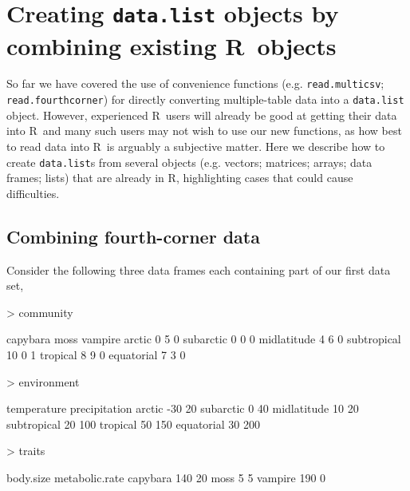 \documentclass{article}
\newcommand{\R}{{\sf R}}
\newcommand{\code}[1]{\texttt{#1}}
\numberwithin{exercise}{section}
\begin{document}
\section{Creating \code{data.list} objects by combining existing \R\ objects}

So far we have covered the use of convenience functions (e.g. \code{read.multicsv}; \code{read.fourthcorner}) for directly converting multiple-table data into a \code{data.list} object.  However, experienced \R\ users will already be good at getting their data into \R\ and many such users may not wish to use our new functions, as how best to read data into \R\ is arguably a subjective matter.  Here we describe how to create \code{data.list}s from several objects (e.g. vectors; matrices; arrays; data frames; lists) that are already in \R, highlighting cases that could cause difficulties.

\subsection{Combining fourth-corner data}


Consider the following three data frames each containing part of our first data set,

\begin{Schunk}
\begin{Sinput}
> community
\end{Sinput}
\begin{Soutput}
            capybara moss vampire
arctic             0    5       0
subarctic          0    0       0
midlatitude        4    6       0
subtropical       10    0       1
tropical           8    9       0
equatorial         7    3       0
\end{Soutput}
\begin{Sinput}
> environment
\end{Sinput}
\begin{Soutput}
            temperature precipitation
arctic              -30            20
subarctic             0            40
midlatitude          10            20
subtropical          20           100
tropical             50           150
equatorial           30           200
\end{Soutput}
\begin{Sinput}
> traits
\end{Sinput}
\begin{Soutput}
         body.size metabolic.rate
capybara       140             20
moss             5              5
vampire        190              0
\end{Soutput}
\end{Schunk}
\end{document}
